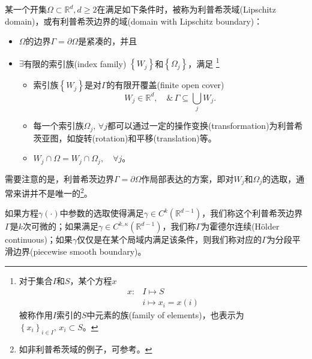 \begin{definition}[利普希茨域]
  \label{definition:bvp-lipschitz-domain-def}
  某一个开集$\Omega \subset \mathbb{R}^d, d \ge 2$在满足如下条件时，被称为利普希茨域(Lipschitz domain)，或有利普希茨边界的域(domain with Lipschitz boundary)：
  \begin{itemize}
    \item $\Omega$的边界$\Gamma = \partial \Omega$是紧凑的，并且
    \item $\exists$有限的索引族(index family)  $\left\{W_j\right\}$和$\left\{ \Omega_j\right\}$，满足
    \footnote{对于集合$I$和$S$，某个方程$x$
    \begin{equation*}
    \begin{split}
      x:&I \mapsto S \\
      &i \mapsto x_i = x(i)
    \end{split}
  \end{equation*}被称作用$I$索引的$S$中元素的族(family of elements)\index{}，也表示为$\left\{ x_i \right\}_{i \in I},\, x_i \subset S$。
  }
  \begin{itemize}
    \item 索引族$\left\{ W_j \right\}$是对$\Gamma$的有限开覆盖(finite open cover)
    \begin{equation*}
      W_j \in \mathbb{R}^d, \quad \& \, \Gamma \subseteq \bigcup_j W_j.
    \end{equation*}
    \item 每一个索引族$\Omega_j, \, \forall j$都可以通过一定的操作变换(transformation)为利普希茨亚图，如旋转(rotation)和平移(translation)等。
    \item $W_j \cap \Omega = W_j \cap \Omega_j, \quad \forall j$。
  \end{itemize}
  \end{itemize}
\end{definition}

需要注意的是，利普希茨边界$\Gamma = \partial \Omega$作局部表达的方案，即对$W_j$和$\Omega_j$的选取，通常来讲并不是唯一的\footnote{如非利普希茨域的例子，可参考\cite{McLean:2000ta}。}。

如果方程$\gamma(\cdot)$中参数的选取使得满足$\gamma \in C^{k}(\mathbb{R}^{d-1})$，我们称这个利普希茨边界$\Gamma$是$k$次可微的；如果满足$\gamma \in C^{k, \kappa}(\mathbb{R}^{d-1})$，我们称$\Gamma$为霍德尔连续(Hölder continuous)；如果$\gamma$仅仅是在某个局域内满足该条件，则我们称对应的$\Gamma$为分段平滑边界(piecewise smooth boundary)。

